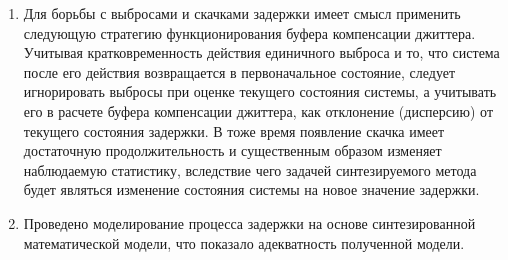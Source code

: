 \begin{enumerate}
\item Для борьбы с выбросами и скачками задержки имеет смысл применить следующую стратегию функционирования буфера компенсации джиттера.
Учитывая кратковременность действия единичного выброса и то, что система после его действия возвращается в первоначальное состояние, следует игнорировать выбросы при оценке текущего состояния системы,
а учитывать его в расчете буфера компенсации джиттера, как отклонение (дисперсию) от текущего состояния задержки.
В тоже время появление скачка имеет достаточную продолжительность и существенным образом изменяет наблюдаемую статистику, вследствие чего задачей синтезируемого метода будет являться изменение состояния системы на новое значение задержки.

\item Проведено моделирование процесса задержки на основе синтезированной математической модели, что показало адекватность полученной модели.
\end{enumerate}

